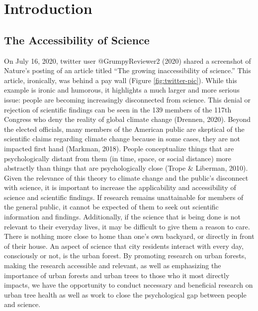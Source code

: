 \documentclass[12pt,twoside]{reedthesis}
\begin{document}
\hypertarget{intro}{%
\chapter{Introduction}\label{intro}}

\hypertarget{the-accessibility-of-science}{%
\section{The Accessibility of Science}\label{the-accessibility-of-science}}

On July 16, 2020, twitter user @GrumpyReviewer2 (2020) shared a
screenshot of Nature's posting of an article titled ``The growing
inaccessibility of science.'' This article, ironically, was behind a pay
wall (Figure \ref{fig:twitter-pic}). While this example is ironic and
humorous, it highlights a much larger and more serious issue: people are
becoming increasingly disconnected from science. This denial or
rejection of scientific findings can be seen in the 139 members of the
117th Congress who deny the reality of global climate change (Drennen, 2020).
Beyond the elected officials, many members of the American public are
skeptical of the scientific claims regarding climate change because in
some cases, they are not impacted first hand (Markman, 2018). People
conceptualize things that are psychologically distant from them (in
time, space, or social distance) more abstractly than things that are
psychologically close (Trope \& Liberman, 2010). Given the relevance of this theory
to climate change and the public's disconnect with science, it is
important to increase the applicability and accessibility of science and
scientific findings. If research remains unattainable for members of the
general public, it cannot be expected of them to seek out scientific
information and findings. Additionally, if the science that is being
done is not relevant to their everyday lives, it may be difficult to
give them a reason to care. There is nothing more close to home than
one's own backyard, or directly in front of their house. An aspect of
science that city residents interact with every day, consciously or not,
is the urban forest. By promoting research on urban forests, making the
research accessible and relevant, as well as emphasizing the importance
of urban forests and urban trees to those who it most directly impacts,
we have the opportunity to conduct necessary and beneficial research on
urban tree health as well as work to close the psychological gap between
people and science.
\end{document}
